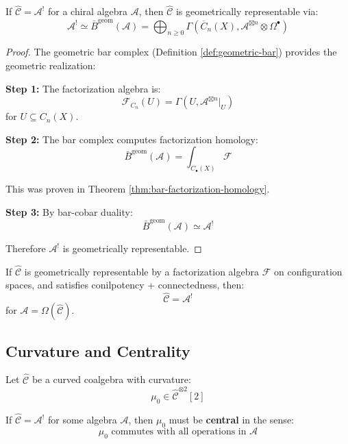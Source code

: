 \begin{theorem}\label{thm:koszul-geom-rep}
If $\widehat{\mathcal{C}} = \mathcal{A}^!$ for a chiral algebra $\mathcal{A}$, then 
$\widehat{\mathcal{C}}$ is geometrically representable via:
$$\mathcal{A}^! \simeq \bar{B}^{\text{geom}}(\mathcal{A}) = 
\bigoplus_{n \geq 0} \Gamma\left(\overline{C}_n(X), \mathcal{A}^{\boxtimes n} 
\otimes \Omega^\bullet\right)$$
\end{theorem}

\begin{proof}
The geometric bar complex (Definition \ref{def:geometric-bar}) provides the 
geometric realization:

\textbf{Step 1:} The factorization algebra is:
$$\mathcal{F}_{C_n}(U) = \Gamma(U, \mathcal{A}^{\boxtimes n}|_U)$$
for $U \subseteq C_n(X)$.

\textbf{Step 2:} The bar complex computes factorization homology:
$$\bar{B}^{\text{geom}}(\mathcal{A}) = \int_{C_\bullet(X)} \mathcal{F}$$

This was proven in Theorem \ref{thm:bar-factorization-homology}.

\textbf{Step 3:} By bar-cobar duality:
$$\bar{B}^{\text{geom}}(\mathcal{A}) \simeq \mathcal{A}^!$$

Therefore $\mathcal{A}^!$ is geometrically representable.
\end{proof}

\begin{corollary}\label{cor:geom-implies-koszul}
If $\widehat{\mathcal{C}}$ is geometrically representable by a factorization algebra 
$\mathcal{F}$ on configuration spaces, and satisfies conilpotency + connectedness, 
then:
$$\widehat{\mathcal{C}} = \mathcal{A}^!$$
for $\mathcal{A} = \Omega(\widehat{\mathcal{C}})$.
\end{corollary}

\subsection{Curvature and Centrality}

\begin{theorem}\label{thm:curvature-central}
Let $\widehat{\mathcal{C}}$ be a curved coalgebra with curvature:
$$\mu_0 \in \widehat{\mathcal{C}}^{\otimes 2}[2]$$

If $\widehat{\mathcal{C}} = \mathcal{A}^!$ for some algebra $\mathcal{A}$, then 
$\mu_0$ must be \textbf{central} in the sense:
$$\mu_0 \text{ commutes with all operations in } \mathcal{A}$$
\end{theorem}

